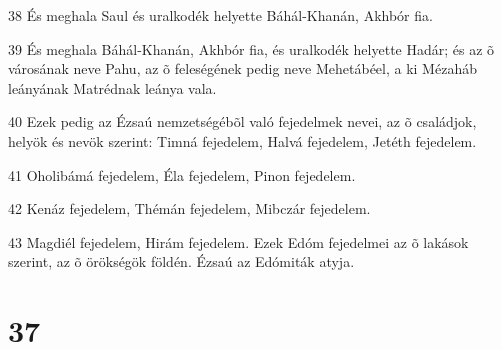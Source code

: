 \par 38 És meghala Saul és uralkodék helyette Báhál-Khanán, Akhbór fia.
\par 39 És meghala Báhál-Khanán, Akhbór fia, és uralkodék helyette Hadár; és az õ városának neve Pahu, az õ feleségének pedig neve Mehetábéel, a ki Mézaháb leányának Matrédnak leánya vala.
\par 40 Ezek pedig az Ézsaú nemzetségébõl való fejedelmek nevei, az õ családjok, helyök és nevök szerint: Timná fejedelem, Halvá fejedelem, Jetéth fejedelem.
\par 41 Oholibámá fejedelem, Éla fejedelem, Pinon fejedelem.
\par 42 Kenáz fejedelem, Thémán fejedelem, Mibczár fejedelem.
\par 43 Magdiél fejedelem, Hirám fejedelem. Ezek Edóm fejedelmei az õ lakások szerint, az õ örökségök földén. Ézsaú az Edómiták atyja.

\chapter{37}

